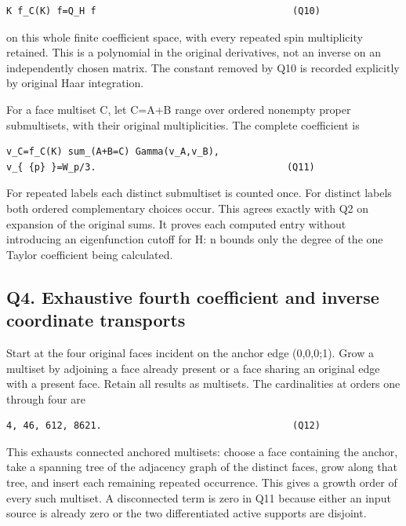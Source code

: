 \documentclass[11pt,a4paper]{article}
\newcounter{none}
\renewcommand{\[}{\begingroup\small\originaldisplaystart}
\renewcommand{\]}{\originaldisplayend\endgroup}
\begin{document}
\begin{verbatim}
K f_C(K) f=Q_H f                                   (Q10)
\end{verbatim}

on this whole finite coefficient space, with every repeated spin
multiplicity retained. This is a polynomial in the original derivatives,
not an inverse on an independently chosen matrix. The constant removed
by Q10 is recorded explicitly by original Haar integration.

For a face multiset C, let C=A+B range over ordered nonempty proper
submultisets, with their original multiplicities. The complete
coefficient is

\begin{verbatim}
v_C=f_C(K) sum_(A+B=C) Gamma(v_A,v_B),
v_{ {p} }=W_p/3.                                  (Q11)
\end{verbatim}

For repeated labels each distinct submultiset is counted once. For
distinct labels both ordered complementary choices occur. This agrees
exactly with Q2 on expansion of the original sums. It proves each
computed entry without introducing an eigenfunction cutoff for H: n
bounds only the degree of the one Taylor coefficient being calculated.

\subsection{Q4. Exhaustive fourth coefficient and inverse coordinate
transports}\label{q4.-exhaustive-fourth-coefficient-and-inverse-coordinate-transports}

Start at the four original faces incident on the anchor edge (0,0,0;1).
Grow a multiset by adjoining a face already present or a face sharing an
original edge with a present face. Retain all results as multisets. The
cardinalities at orders one through four are

\begin{verbatim}
4, 46, 612, 8621.                                  (Q12)
\end{verbatim}

This exhausts connected anchored multisets: choose a face containing the
anchor, take a spanning tree of the adjacency graph of the distinct
faces, grow along that tree, and insert each remaining repeated
occurrence. This gives a growth order of every such multiset. A
disconnected term is zero in Q11 because either an input source is
already zero or the two differentiated active supports are disjoint.
\end{document}
